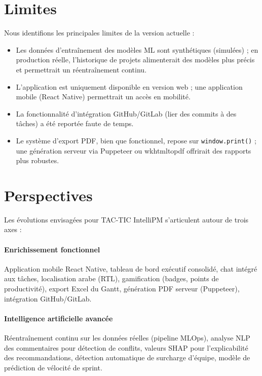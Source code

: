 \section*{Limites}

Nous identifions les principales limites de la version actuelle :

\begin{itemize}
  \item Les données d'entraînement des modèles ML sont synthétiques (simulées) ;
        en production réelle, l'historique de projets alimenterait des modèles
        plus précis et permettrait un réentraînement continu.
  \item L'application est uniquement disponible en version web ; une application
        mobile (React Native) permettrait un accès en mobilité.
  \item La fonctionnalité d'intégration GitHub/GitLab (lier des commits à des
        tâches) a été reportée faute de temps.
  \item Le système d'export PDF, bien que fonctionnel, repose sur
        \texttt{window.print()} ; une génération serveur via Puppeteer ou
        wkhtmltopdf offrirait des rapports plus robustes.
\end{itemize}

\section*{Perspectives}

Les évolutions envisagées pour TAC-TIC IntelliPM s'articulent autour de trois axes :

\paragraph{Enrichissement fonctionnel}
Application mobile React Native, tableau de bord exécutif consolidé, chat intégré
aux tâches, localisation arabe (RTL), gamification (badges, points de productivité),
export Excel du Gantt, génération PDF serveur (Puppeteer), intégration GitHub/GitLab.

\paragraph{Intelligence artificielle avancée}
Réentraînement continu sur les données réelles (pipeline MLOps), analyse NLP des
commentaires pour détection de conflits, valeurs SHAP pour l'explicabilité des
recommandations, détection automatique de surcharge d'équipe, modèle de prédiction
de vélocité de sprint.

